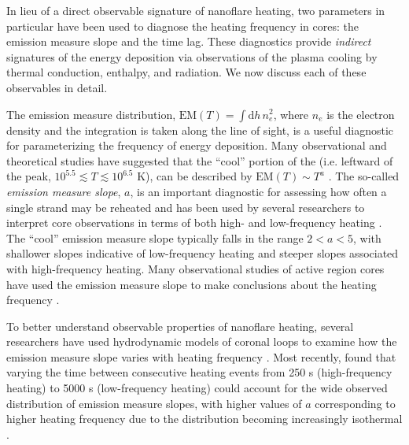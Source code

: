 In lieu of a direct observable signature of nanoflare heating, two parameters in particular have been used to diagnose the heating frequency in \AR{} cores: the emission measure slope and the time lag. These diagnostics provide \textit{indirect} signatures of the energy deposition via observations of the plasma cooling by thermal conduction, enthalpy, and radiation. We now discuss each of these observables in detail.

The emission measure distribution, $\mathrm{EM}(T)=\int\mathrm{d}h\,n_e^2$, where $n_e$ is the electron density and the integration is taken along the line of sight, is a useful diagnostic for parameterizing the frequency of energy deposition. Many observational and theoretical studies have suggested that the ``cool'' portion of the \dem{} (i.e. leftward of the peak, $10^{5.5}\lesssim T\lesssim10^{6.5}$ K), can be described by $\mathrm{EM}(T)\sim T^a$ \citep{jordan_structure_1976,cargill_implications_1994,cargill_nanoflare_2004}. The so-called \textit{emission measure slope}, $a$, is an important diagnostic for assessing how often a single strand may be reheated and has been used by several researchers to interpret \AR{} core observations in terms of both high- and low-frequency heating \citep[see Table 3 of][and references therein]{bradshaw_diagnosing_2012}. The ``cool'' emission measure slope typically falls in the range $2<a<5$, with shallower slopes indicative of low-frequency heating and steeper slopes associated with high-frequency heating. Many observational studies of active region cores have used the emission measure slope to make conclusions about the heating frequency \citep[e.g.][]{tripathi_emission_2011,warren_constraints_2011,winebarger_using_2011,schmelz_cold_2012,warren_systematic_2012,del_zanna_evolution_2015}.

To better understand observable properties of nanoflare heating, several researchers have used hydrodynamic models of coronal loops to examine how the emission measure slope varies with heating frequency \citep{mulu-moore_can_2011,bradshaw_diagnosing_2012,reep_diagnosing_2013}. Most recently, \citet{cargill_active_2014} found that varying the time between consecutive heating events from 250 s (high-frequency heating) to 5000 s (low-frequency heating) could account for the wide observed distribution of emission measure slopes, with higher values of $a$ corresponding to higher heating frequency due to the \dem{} distribution becoming increasingly isothermal \citep[see also][]{barnes_inference_2016-1}.

